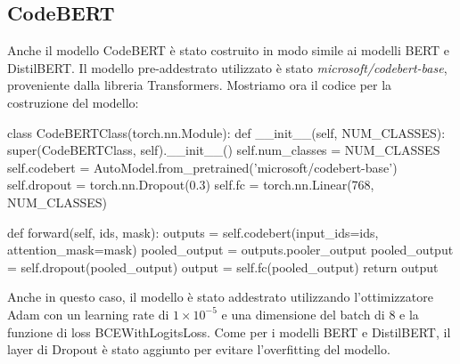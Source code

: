 \documentclass[../../Thesis.tex]{subfiles}
\begin{document}
\subsection{CodeBERT}
Anche il modello CodeBERT \`e stato costruito in modo simile ai modelli BERT e DistilBERT. Il modello pre-addestrato utilizzato \`e stato \textit{microsoft/codebert-base}, proveniente dalla libreria Transformers. Mostriamo ora il codice per la costruzione del modello:
\begin{python}
    class CodeBERTClass(torch.nn.Module):
        def __init__(self, NUM_CLASSES):
            super(CodeBERTClass, self).__init__()
            self.num_classes = NUM_CLASSES
            self.codebert = AutoModel.from_pretrained('microsoft/codebert-base')
            self.dropout = torch.nn.Dropout(0.3)
            self.fc = torch.nn.Linear(768, NUM_CLASSES)
        
        def forward(self, ids, mask):
            outputs = self.codebert(input_ids=ids, attention_mask=mask)
            pooled_output = outputs.pooler_output
            pooled_output = self.dropout(pooled_output)
            output = self.fc(pooled_output)
            return output
\end{python}
Anche in questo caso, il modello \`e stato addestrato utilizzando l'ottimizzatore Adam con un learning rate di $1 \times 10^{-5}$ e una dimensione del batch di 8 e la funzione di loss BCEWithLogitsLoss. Come per i modelli BERT e DistilBERT, il layer di Dropout \`e stato aggiunto per evitare l'overfitting del modello.
\end{document}
